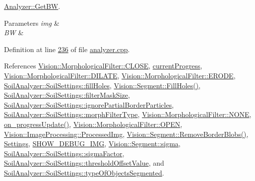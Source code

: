 \hyperlink{class_soil_analyzer_1_1_analyzer_a13975656889dddd31bb9cff565fd3c9f}{Analyzer\+::\+Get\+B\+W}. 


\begin{DoxyParams}{Parameters}
{\em img} & \\
\hline
{\em B\+W} & \\
\hline
\end{DoxyParams}


Definition at line \hyperlink{analyzer_8cpp_source_l00236}{236} of file \hyperlink{analyzer_8cpp_source}{analyzer.\+cpp}.



References \hyperlink{_morphological_filter_8h_source_l00016}{Vision\+::\+Morphological\+Filter\+::\+C\+L\+O\+S\+E}, \hyperlink{analyzer_8h_source_l00067}{current\+Progress}, \hyperlink{_morphological_filter_8h_source_l00016}{Vision\+::\+Morphological\+Filter\+::\+D\+I\+L\+A\+T\+E}, \hyperlink{_morphological_filter_8h_source_l00016}{Vision\+::\+Morphological\+Filter\+::\+E\+R\+O\+D\+E}, \hyperlink{soilsettings_8h_source_l00055}{Soil\+Analyzer\+::\+Soil\+Settings\+::fill\+Holes}, \hyperlink{_segment_8cpp_source_l00615}{Vision\+::\+Segment\+::\+Fill\+Holes()}, \hyperlink{soilsettings_8h_source_l00064}{Soil\+Analyzer\+::\+Soil\+Settings\+::filter\+Mask\+Size}, \hyperlink{soilsettings_8h_source_l00053}{Soil\+Analyzer\+::\+Soil\+Settings\+::ignore\+Partial\+Border\+Particles}, \hyperlink{soilsettings_8h_source_l00060}{Soil\+Analyzer\+::\+Soil\+Settings\+::morph\+Filter\+Type}, \hyperlink{_morphological_filter_8h_source_l00016}{Vision\+::\+Morphological\+Filter\+::\+N\+O\+N\+E}, \hyperlink{class_soil_analyzer_1_1_analyzer_a808a8c21029471c4af0be996cb67d14c}{on\+\_\+progress\+Update()}, \hyperlink{_morphological_filter_8h_source_l00016}{Vision\+::\+Morphological\+Filter\+::\+O\+P\+E\+N}, \hyperlink{_image_processing_8h_source_l00064}{Vision\+::\+Image\+Processing\+::\+Processed\+Img}, \hyperlink{_segment_8cpp_source_l00245}{Vision\+::\+Segment\+::\+Remove\+Border\+Blobs()}, \hyperlink{analyzer_8h_source_l00047}{Settings}, \hyperlink{_vision_debug_8h_source_l00025}{S\+H\+O\+W\+\_\+\+D\+E\+B\+U\+G\+\_\+\+I\+M\+G}, \hyperlink{_segment_8h_source_l00093}{Vision\+::\+Segment\+::sigma}, \hyperlink{soilsettings_8h_source_l00056}{Soil\+Analyzer\+::\+Soil\+Settings\+::sigma\+Factor}, \hyperlink{soilsettings_8h_source_l00058}{Soil\+Analyzer\+::\+Soil\+Settings\+::threshold\+Offset\+Value}, and \hyperlink{soilsettings_8h_source_l00051}{Soil\+Analyzer\+::\+Soil\+Settings\+::type\+Of\+Objects\+Segmented}.



